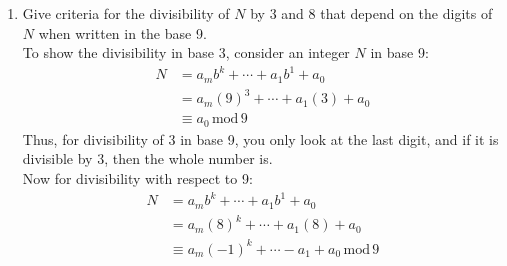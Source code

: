 \documentclass[10pt,oneside]{book}
\newcommand{\gspc}{\vspace{0.13cm}} %
\newcommand{\gline}{\gspc\\} %
\newcommand{\gmod}{\,\text{mod}\,}
\newcommand{\centerit}[1]{{\begin{center} #1 \end{center}}}
\let\endoldproof\endproof
\renewenvironment{proof}[1][\proofname]
  {\vspace{0.2cm}\begin{adjustwidth}{2em}{2em}
   \oldproof[#1]}
  {\endoldproof
\end{adjustwidth}}
\begin{document}
\begin{enumerate}
\begin{enumerate}
\begin{proof}
			\centerit{\textbf{Forwards: Assume $b-1\mid N$}}
			We want to show that if $b-1\mid N$, then $b-1\mid (a_m+\cdots+a_2+a_1+a_0$. \gline
			Because $b-1\mid N$, we know that $N\equiv 0 \gmod (b-1)$. Thus, because $b \equiv 1 \gmod b-1$, we write:
			\begin{align*}
				0 &\equiv a_mb^m+\cdots + a_1b + a_0\; \gmod (b-1)\\
				&\equiv a_m(1)^m +\cdots + a_1(1)^1 + a_0\;\gmod (b-1)\\
				&= a_m+\cdots a_1 + a_0
			\end{align*}
			Thus, because $a_m+\cdots+a_1+a_0\equiv 0 \gmod b-1$, the forwards direction holds.\gline
			We now proceed with the backwards direction.
			\pagebreak
			\centerit{\textbf{Backwards: Assume $b-1\mid a_m+\cdots+a_1+a_0$}}
			We want to show that if $b-1\mid a_m+\cdots+a_1+a_0$, then $b-1\mid N$. \gline
			Consider that in $\gmod b-1$, any integer $n\equiv b^kn(\gmod b-1)$, because $b \equiv 1 \gmod b -1$. Thus, we have that:
			\begin{align*}
				0 &\equiv a_m+\cdots+a_1+a_0\gmod(b-1)\\
				&\equiv b^ka_m + \cdots +ba_1+a_0\gmod b-1\\
				&\equiv N \gmod (b-1)
			\end{align*}
			Thus, because $N\equiv 0\gmod (b-1)$, $b-1\mid N$, and the backwards direction holds.\gline
			Hence, $b-1\mid N$ if and only if $b-1 \mid (a_m+\cdots+a_2+a_1+a_0)$, as desired.
		\end{proof}
		\item Give criteria for the divisibility of $N$ by 3 and 8 that depend on the digits of $N$ when written in the base 9. \gline
		To show the divisibility in base 3, consider an integer $N$ in base 9:
		\begin{align*}
			N &= a_mb^k + \cdots + a_1b^1 + a_0\\
			&= a_m(9)^3 + \cdots + a_1(3) + a_0\\
			&\equiv a_0\gmod 9
		\end{align*}
		Thus, for divisibility of 3 in base 9, you only look at the last digit, and if it is divisible by 3, then the whole number is.\gline
		Now for divisibility with respect to 9:
		\begin{align*}
			N &= a_mb^k + \cdots + a_1b^1 + a_0\\
			&= a_m(8)^k + \cdots + a_1(8) + a_0\\
			&\equiv a_m(-1)^k + \cdots - a_1 + a_0\gmod 9
		\end{align*}

\end{enumerate}
\end{enumerate}
\end{document}
